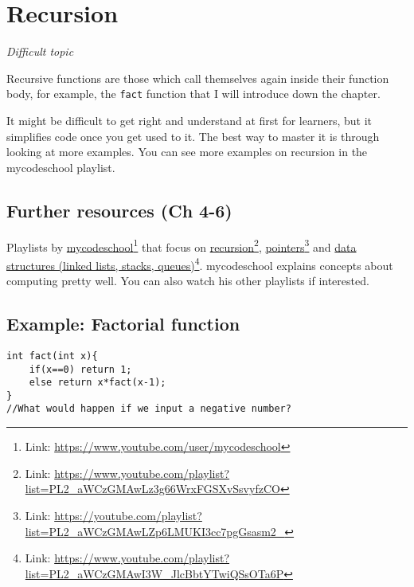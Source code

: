 \chapter{Recursion}

\textit{Difficult topic}
\vspace{6mm}

Recursive functions are those which call themselves again inside their function body, for example, the \texttt{fact} function that I will introduce down the chapter.

It might be difficult to get right and understand at first for learners, but it simplifies code once you get used to it. The best way to master it is through looking at more examples. You can see more examples on recursion in the mycodeschool playlist.

\section{Further resources (Ch 4-6)}

Playlists by 
\href{https://www.youtube.com/user/mycodeschool}{mycodeschool}\footnote{Link: \href{https://www.youtube.com/user/mycodeschool}{https://www.youtube.com/user/mycodeschool}}
that focus on 
\href{https://www.youtube.com/playlist?list=PL2\_aWCzGMAwLz3g66WrxFGSXvSsvyfzCO}{recursion}\footnote{Link: \href{https://www.youtube.com/playlist?list=PL2\_aWCzGMAwLz3g66WrxFGSXvSsvyfzCO}{https://www.youtube.com/playlist?list=PL2\_aWCzGMAwLz3g66WrxFGSXvSsvyfzCO}}, 
\href{https://youtube.com/playlist?list=PL2_aWCzGMAwLZp6LMUKI3cc7pgGsasm2_}{pointers}\footnote{Link: \href{https://youtube.com/playlist?list=PL2_aWCzGMAwLZp6LMUKI3cc7pgGsasm2_}{https://youtube.com/playlist?list=PL2\_aWCzGMAwLZp6LMUKI3cc7pgGsasm2\_}} and 
\href{https://www.youtube.com/playlist?list=PL2_aWCzGMAwI3W_JlcBbtYTwiQSsOTa6P}{data structures (linked lists, stacks, queues)}\footnote{Link: \href{https://www.youtube.com/playlist?list=PL2_aWCzGMAwI3W_JlcBbtYTwiQSsOTa6P}{https://www.youtube.com/playlist?list=PL2\_aWCzGMAwI3W\_JlcBbtYTwiQSsOTa6P}}.
mycodeschool explains concepts about computing pretty well. You can also watch his other playlists if interested.

\section{Example: Factorial function}

\begin{lstlisting}
int fact(int x){
    if(x==0) return 1;
    else return x*fact(x-1);
}
//What would happen if we input a negative number?
\end{lstlisting}

